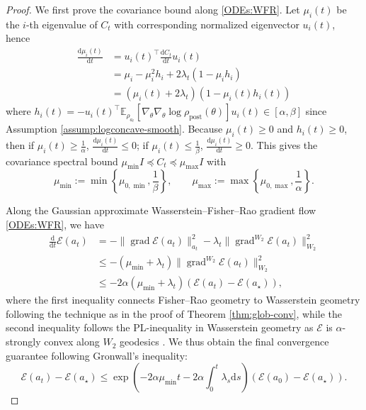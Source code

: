 \documentclass[11pt]{article}
\theoremstyle{plain}
\theoremstyle{definition}
\theoremstyle{remark}
\newcommand{\E}{\mathbb{E}}
\newcommand{\post}{\mathrm{post}}
\newcommand{\grad}{\operatorname{grad}}
\newcommand{\dd}{\mathrm{d}}
\begin{document}
\begin{proof}
    We first prove the covariance bound along \eqref{ODEs:WFR}. Let $\mu_i (t)$ be the $i$-th eigenvalue of $C_t$ with corresponding normalized eigenvector $u_i (t)$, hence
    \begin{align*}
        \frac{\dd \mu_i (t)}{\dd t} &= u_i(t)^\top \frac{\dd C_t}{\dd t} u_i (t) \\
        &= \mu_i - \mu_i^2 h_i + 2\lambda_t (1 - \mu_i h_i) \\
        &= (\mu_i (t) + 2\lambda_t ) (1 - \mu_i(t) h_i(t))
    \end{align*}
    where $h_i (t) = -u_i (t)^\top \E_{\rho_{a_t}} [\nabla_\theta \nabla_\theta \log \rho_\post (\theta)] u_i (t) \in [\alpha, \beta]$ since Assumption \ref{assump:logconcave-smooth}. Because $\mu_i (t) \geq 0$ and $h_i(t) \geq 0$, then if $\mu_i (t) \geq \frac{1}{\alpha}$, $\frac{\dd \mu_i(t)}{\dd t} \leq 0$; if $\mu_i (t) \leq \frac{1}{\beta}$, $\frac{\dd \mu_i(t)}{\dd t} \geq 0$. This gives the covariance spectral bound $\mu_{\min} I \preceq C_t \preceq \mu_{\max} I$ with 
    \begin{equation*}
        \mu_{\min} := \min \left\{ \mu_{0, \min}, \frac{1}{\beta} \right\}, \qquad \mu_{\max} := \max \left\{ \mu_{0, \max}, \frac{1}{\alpha} \right\}.
    \end{equation*}

    Along the Gaussian approximate Wasserstein--Fisher--Rao gradient flow \eqref{ODEs:WFR}, we have 
    \begin{align*}
        \frac{\dd }{\dd t} \mathcal{E} (a_t) &= -\|\grad \mathcal{E} (a_t) \|_{a_t}^2 -\lambda_t \|\grad^{W_2} \mathcal{E} (a_t) \|_{W_2}^2 \\
        &\leq - (\mu_{\min} + \lambda_t) \| \grad^{W_2} \mathcal{E} (a_t) \|_{W_2}^2 \\
        &\leq -2\alpha (\mu_{\min} + \lambda_t) (\mathcal{E} (a_t) - \mathcal{E} (a_\star)),
    \end{align*}
    where the first inequality connects Fisher--Rao geometry to Wasserstein geometry following the technique as in the proof of Theorem \ref{thm:glob-conv}, while the second inequality follows the PL-inequality in Wasserstein geometry as $\mathcal{E}$ is $\alpha$-strongly convex along $W_2$ geodesics \cite{lambert2022variational}. We thus obtain the final convergence guarantee following Gronwall's inequality:
    \begin{equation*}
        \mathcal{E} (a_t) - \mathcal{E} (a_\star) \leq \exp \left( -2\alpha \mu_{\min} t - 2\alpha \int_0^t \lambda_s \dd s \right) (\mathcal{E} (a_0) - \mathcal{E} (a_\star)).
    \end{equation*}
\end{proof}
\end{document}
